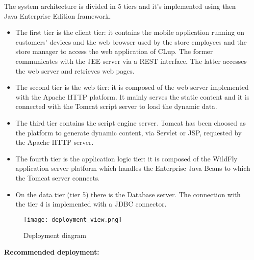 The system architecture is divided in 5 tiers and it's implemented using then Java Enterprise Edition framework.
\begin{itemize}
    \item The first tier is the client tier: it contains the mobile application running on customers' devices and the web browser used by the store employees and the store manager to access the web application of CLup. The former communicates with the JEE server via a REST interface. The latter accesses the web server and retrieves web pages.
    \item The second tier is the web tier: it is composed of the web server implemented with the Apache HTTP platform. It mainly serves the static content and it is connected with the Tomcat script server to load the dynamic data.
    \item The third tier contains the script engine server. Tomcat has been choosed as the platform to generate dynamic content, via Servlet or JSP, requested by the Apache HTTP server.
    \item The fourth tier is the application logic tier: it is composed of the WildFly application server platform which handles the Enterprise Java Beans to which the Tomcat server connects.
    \item On the data tier (tier 5) there is the Database server. The connection with the tier 4 is implemented with a JDBC connector.
\end{itemize}

\begin{figure}[H]
    \centering
    \texttt{[image: deployment\_view.png]}
    \caption{Deployment diagram}
\end{figure} 

\textbf{Recommended deployment:}


